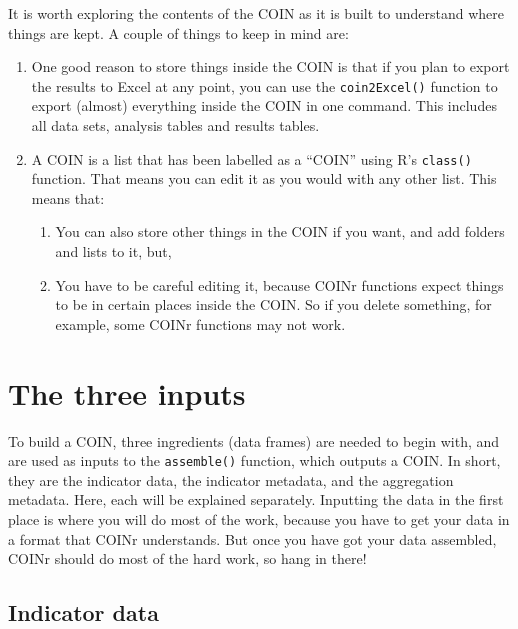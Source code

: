 \documentclass[
]{book}
\providecommand{\tightlist}{%
  \setlength{\itemsep}{0pt}\setlength{\parskip}{0pt}}
\begin{document}
It is worth exploring the contents of the COIN as it is built to understand where things are kept. A couple of things to keep in mind are:

\begin{enumerate}
\def\labelenumi{\arabic{enumi}.}
\tightlist
\item
  One good reason to store things inside the COIN is that if you plan to export the results to Excel at any point, you can use the \texttt{coin2Excel()} function to export (almost) everything inside the COIN in one command. This includes all data sets, analysis tables and results tables.
\item
  A COIN is a list that has been labelled as a ``COIN'' using R's \texttt{class()} function. That means you can edit it as you would with any other list. This means that:

  \begin{enumerate}
  \def\labelenumii{(\alph{enumii})}
  \tightlist
  \item
    You can also store other things in the COIN if you want, and add folders and lists to it, but,
  \item
    You have to be careful editing it, because COINr functions expect things to be in certain places inside the COIN. So if you delete something, for example, some COINr functions may not work.
  \end{enumerate}
\end{enumerate}

\hypertarget{the-three-inputs}{%
\section{The three inputs}\label{the-three-inputs}}

To build a COIN, three ingredients (data frames) are needed to begin with, and are used as inputs to the \texttt{assemble()} function, which outputs a COIN. In short, they are the indicator data, the indicator metadata, and the aggregation metadata. Here, each will be explained separately. Inputting the data in the first place is where you will do most of the work, because you have to get your data in a format that COINr understands. But once you have got your data assembled, COINr should do most of the hard work, so hang in there!

\hypertarget{indicator-data}{%
\subsection{Indicator data}\label{indicator-data}}
\end{document}

